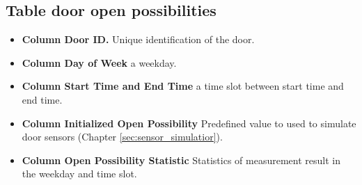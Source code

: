 \subsection*{Table door open possibilities}
\begin{itemize}
    \item \textbf{Column Door ID.} Unique identification of the door. 
    \item \textbf{Column Day of Week} a weekday.
    \item \textbf{Column Start Time and End Time} a time slot between start time and end time.
    \item \textbf{Column Initialized Open Possibility} Predefined value to used to simulate door sensors (Chapter \ref{sec:sensor_simulatior}).
    \item \textbf{Column Open Possibility Statistic} Statistics of measurement result in the weekday and time slot.
    \begin{table}[htb]
    \centering
    \caption{Door Open Possibility}
    \label{tab:db_open_possibilities}
    \end{table}
\end{itemize}

